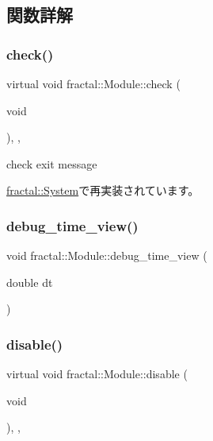 \subsection{関数詳解}
\mbox{\label{classfractal_1_1Module_a245865f346ac1d21b19bce418bf704c4}} 
\subsubsection{\texorpdfstring{check()}{check()}}
{\footnotesize\ttfamily virtual void fractal\+::\+Module\+::check (\begin{DoxyParamCaption}\item[{void}]{ }\end{DoxyParamCaption})\hspace{0.3cm}{\ttfamily [inline]}, {\ttfamily [protected]}, {\ttfamily [virtual]}}



check exit message 



\hyperlink{classfractal_1_1System_a95f99e9132a10f87f9179a27c840fa50}{fractal\+::\+System}で再実装されています。

\mbox{\label{classfractal_1_1Module_aa1799cce209611e46fafb8e826f4dc2e}} 
\subsubsection{\texorpdfstring{debug\+\_\+time\+\_\+view()}{debug\_time\_view()}}
{\footnotesize\ttfamily void fractal\+::\+Module\+::debug\+\_\+time\+\_\+view (\begin{DoxyParamCaption}\item[{double}]{dt }\end{DoxyParamCaption})\hspace{0.3cm}{\ttfamily [inline]}}

\mbox{\label{classfractal_1_1Module_a17a7773769fb523fd4b2aeb28366debe}} 
\subsubsection{\texorpdfstring{disable()}{disable()}}
{\footnotesize\ttfamily virtual void fractal\+::\+Module\+::disable (\begin{DoxyParamCaption}\item[{void}]{ }\end{DoxyParamCaption})\hspace{0.3cm}{\ttfamily [inline]}, {\ttfamily [protected]}, {\ttfamily [virtual]}}



